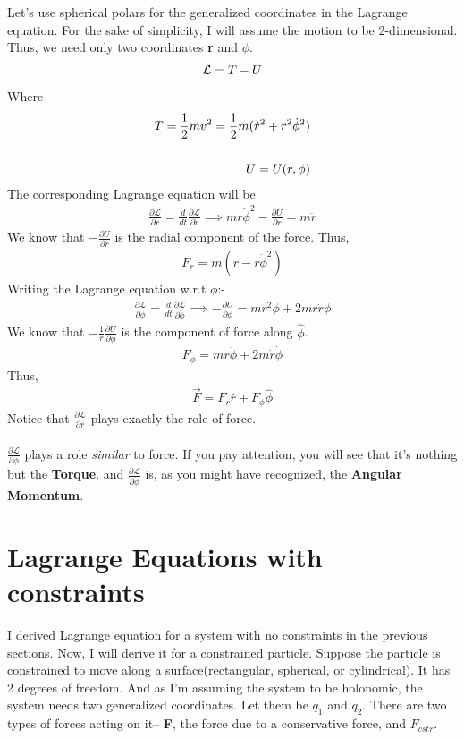 \documentclass[12pt]{article}
\begin{document}
    Let's use spherical polars for the generalized coordinates in the Lagrange equation. For the sake of simplicity,
    I will assume the motion to be 2-dimensional. Thus, we need only two coordinates \textbf{r} and $\phi$.
    \begin{align}
        \mathcal{L}=T-U \notag
    \end{align}
    Where
    \begin{align}
        T = \frac{1}{2}mv^2 = \frac{1}{2}m(\dot{r}^2+r^2\dot{\phi}^2) \notag \\ \notag \\ U = U(r,\phi) \notag
    \end{align}
    The corresponding Lagrange equation will be
    \begin{align}
        \frac{\partial \mathcal{L}}{\partial r}=\frac{d}{dt}\frac{\partial \mathcal{L}}{\partial \dot{r}} \implies mr\dot{\phi}^2-\frac{\partial U}{\partial r}= m\ddot{r}
    \end{align}
    We know that $-\frac{\partial U}{\partial r}$ is the radial component of the force. Thus,
    \\ \begin{align}
        F_r=m(\ddot{r}-r\dot{\phi}^2)
    \end{align} 
    Writing the Lagrange equation w.r.t $\phi$:-
    \begin{align}
        \frac{\partial \mathcal{L}}{\partial \phi}=\frac{d}{dt}\frac{\partial \mathcal{L}}{\partial \dot{\phi}} \implies -\frac{\partial U}{\partial \phi}=mr^2\ddot{\phi}+2mr\dot{r}\dot{\phi}
    \end{align}
 We know that $-\frac{1}{r}\frac{\partial U}{\partial \phi}$ is the component of force along $\hat{\phi}$.
    \begin{align}
        F_\phi = mr\ddot{\phi}+2m\dot{r}\dot{\phi}
    \end{align}
    Thus,
    \begin{align}
        \vec{F}=F_r\hat{r}+F_\phi \hat{\phi}
    \end{align}
    Notice that $\frac{\partial \mathcal{L}}{\partial r}$ plays exactly the role of force. \\ \\ $\frac{\partial \mathcal{L}}{\partial \phi}$ plays a role \textit{similar} to force.
    If you pay attention, you will see that it's nothing but the \textbf{Torque}. and $\frac{\partial \mathcal{L}}{\partial \dot{\phi}}$ is, as you might have recognized, the \textbf{Angular Momentum}.
    \section{Lagrange Equations with constraints}
    I derived Lagrange equation for a system with no constraints in the previous sections. Now, I will derive it for a constrained particle.
    Suppose the particle is constrained to move along a surface(rectangular, spherical, or cylindrical). It has 2 degrees of freedom.
    And as I'm assuming the system to be holonomic, the system needs two generalized coordinates. Let them be $q_1$ and $q_2$.
    There are two types of forces acting on it-- \textbf{F}, the force due to a conservative force, and \textbf{$F_{cstr}$}.
    
\end{document}
